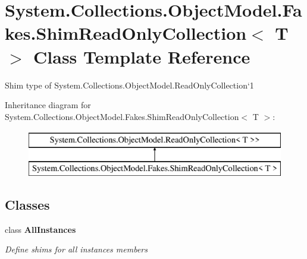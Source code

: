 \hypertarget{class_system_1_1_collections_1_1_object_model_1_1_fakes_1_1_shim_read_only_collection_3_01_t_01_4}{\section{System.\-Collections.\-Object\-Model.\-Fakes.\-Shim\-Read\-Only\-Collection$<$ T $>$ Class Template Reference}
\label{class_system_1_1_collections_1_1_object_model_1_1_fakes_1_1_shim_read_only_collection_3_01_t_01_4}
}


Shim type of System.\-Collections.\-Object\-Model.\-Read\-Only\-Collection`1 


Inheritance diagram for System.\-Collections.\-Object\-Model.\-Fakes.\-Shim\-Read\-Only\-Collection$<$ T $>$\-:\begin{figure}[H]
\begin{center}
\leavevmode
\includegraphics[height=2.000000cm]{class_system_1_1_collections_1_1_object_model_1_1_fakes_1_1_shim_read_only_collection_3_01_t_01_4}
\end{center}
\end{figure}
\subsection*{Classes}
\begin{DoxyCompactItemize}
\item 
class {\bfseries All\-Instances}
\begin{DoxyCompactList}\small\item\em Define shims for all instances members\end{DoxyCompactList}\end{DoxyCompactItemize}
